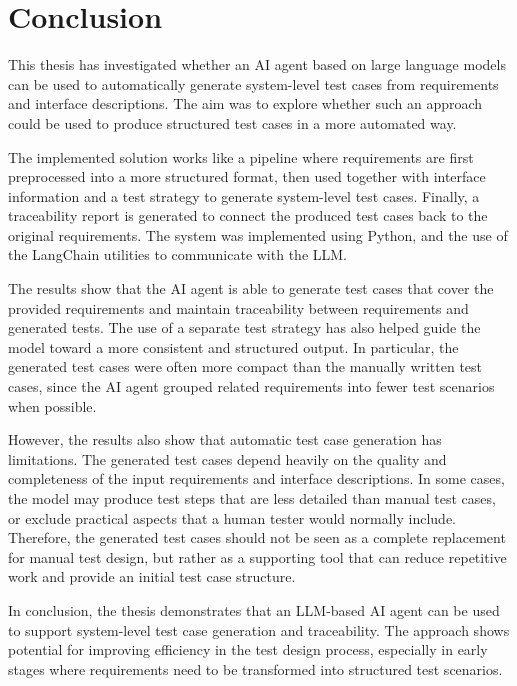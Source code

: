 \documentclass[a4paper,12pt]{article}
\begin{document}
\newpage
		
\section{Conclusion}
This thesis has investigated whether an AI agent based on large language models can be used to automatically generate system-level test cases from requirements and interface descriptions. The aim was to explore whether such an approach could be used to produce structured test cases in a more automated way.

The implemented solution works like a pipeline where requirements are first preprocessed into a more structured format, then used together with interface information and a test strategy to generate system-level test cases. Finally, a traceability report is generated to connect the produced test cases back to the original requirements. The system was implemented using Python, and the use of the LangChain utilities to communicate with the LLM.

The results show that the AI agent is able to generate test cases that cover the provided requirements and maintain traceability between requirements and generated tests. The use of a separate test strategy has also helped guide the model toward a more consistent and structured output. In particular, the generated test cases were often more compact than the manually written test cases, since the AI agent grouped related requirements into fewer test scenarios when possible.

However, the results also show that automatic test case generation has limitations. The generated test cases depend heavily on the quality and completeness of the input requirements and interface descriptions. In some cases, the model may produce test steps that are less detailed than manual test cases, or exclude practical aspects that a human tester would normally include. Therefore, the generated test cases should not be seen as a complete replacement for manual test design, but rather as a supporting tool that can reduce repetitive work and provide an initial test case structure.

In conclusion, the thesis demonstrates that an LLM-based AI agent can be used to support system-level test case generation and traceability. The approach shows potential for improving efficiency in the test design process, especially in early stages where requirements need to be transformed into structured test scenarios. 
\end{document}
